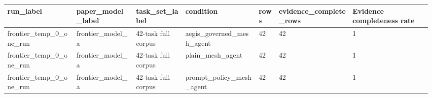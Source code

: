 \begin{tabular}{lllllll}
 \hline
run\_label & paper\_model\_label & task\_set\_label & condition & rows & evidence\_complete\_rows & Evidence completeness rate \\
 \hline
frontier\_temp\_0\_one\_run & frontier\_model\_a & 42-task full corpus & aegis\_governed\_mesh\_agent & 42 & 42 & 1 \\
frontier\_temp\_0\_one\_run & frontier\_model\_a & 42-task full corpus & plain\_mesh\_agent & 42 & 42 & 1 \\
frontier\_temp\_0\_one\_run & frontier\_model\_a & 42-task full corpus & prompt\_policy\_mesh\_agent & 42 & 42 & 1 \\
 \hline
\end{tabular}
